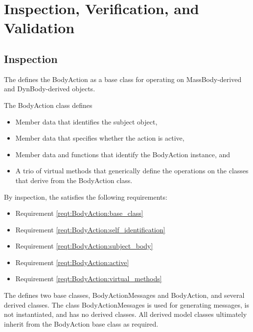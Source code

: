 %

\chapter{Inspection, Verification, and Validation}\label{ch:\modelpartid:ivv}

\section{Inspection}\label{sec:BodyAction:inspect}

\label{inspect:BodyAction:base_class}
The \ModelDesc defines the BodyAction as a base class
for operating on MassBody-derived and DynBody-derived objects.

The BodyAction class defines
\begin{itemize}
\item Member data that identifies the subject object,
\item Member data that specifies whether the action is active,
\item Member data and functions that identify the BodyAction instance, and
\item A trio of virtual methods that generically define the operations on the
classes that derive from the BodyAction class.
\end{itemize}

By inspection, the \ModelDesc satisfies the following requirements:
\begin{itemize}
\item Requirement \ref{reqt:BodyAction:base_class}
\item Requirement \ref{reqt:BodyAction:self_identification}
\item Requirement \ref{reqt:BodyAction:subject_body}
\item Requirement \ref{reqt:BodyAction:active}
\item Requirement \ref{reqt:BodyAction:virtual_methods}
\end{itemize}

\label{inspect:BodyAction:derived_classes}
The \ModelDesc defines two base classes,
BodyActionMessages and BodyAction, and several derived classes.
The class BodyActionMessages is used for generating messages,
is not instantiated, and has no derived classes.
All derived model classes ultimately inherit from
the BodyAction base class as required.

